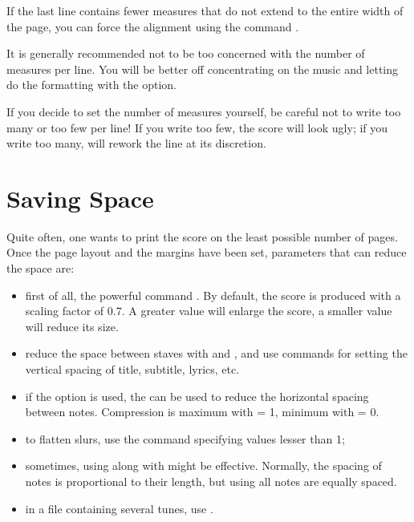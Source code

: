 \documentclass[a4paper,12pt]{book}
\begin{document}
If the last line contains fewer measures that do not extend to the
entire width of the page, you can force the alignment using the
command .

It is generally recommended not to be too concerned with the number of
measures per line. You will be better off concentrating on the music
and letting \abcm{} do the formatting with the  option.

\begin{warn}

  If you decide to set the number of measures yourself, be careful not
  to write too many or too few per line! If you write too few, the
  score will look ugly; if you write too many, \abcm{} will rework the
  line at its discretion.

\end{warn}




\section{Saving Space}
\label{sec:saving}

Quite often, one wants to print the score on the least possible number
of pages. Once the page layout and the margins have been set,
parameters that can reduce the space are:

\begin{itemize}
  
  \item first of all, the powerful command 
  . By default, the score is produced with a scaling
  factor of 0.7. A greater value will enlarge the score, a smaller
  value will reduce its size.
  
  \item reduce the space between staves with  and
  , and use commands for setting the vertical
  spacing of title, subtitle, lyrics, etc.\ 
  
  \item if the  option is used, the 
   can be used to reduce the horizontal spacing between
  notes. Compression is maximum with  = 1, minimum with
   = 0.
  
  \item to flatten slurs, use the  command
  specifying values lesser than 1;
  
  \item sometimes, using  along
  with  might be effective. Normally, the spacing
  of notes is proportional to their length, but using
   all notes are equally spaced.
  
  \item in a file containing several tunes, use .
  
\end{itemize}
\end{document}
